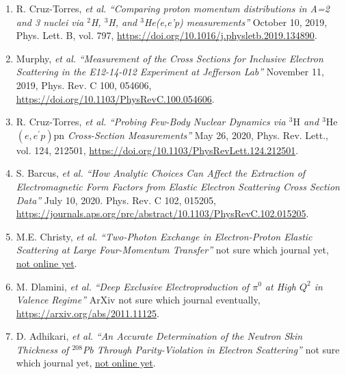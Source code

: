 \documentclass[letterpaper,10pt]{article}
\begin{document}
{\begin{enumerate}

\item R. Cruz-Torres, \textit{et al.} \textit{``Comparing proton momentum distributions in A=2 and 3 nuclei via $^2$H, $^3$H, and $^3$He(e,e'p) measurements''} October 10, 2019, Phys. Lett. B, vol. 797, \url{https://doi.org/10.1016/j.physletb.2019.134890}.

\item Murphy, \textit{et al.} \textit{``Measurement of the Cross Sections for Inclusive Electron Scattering in the E12-14-012 Experiment at Jefferson Lab''} November 11, 2019, Phys. Rev. C 100, 054606, \url{https://doi.org/10.1103/PhysRevC.100.054606}.

\item R. Cruz-Torres, \textit{et al.} \textit{``Probing Few-Body Nuclear Dynamics via $^{3}\mathrm{H}$ and $^{3}\mathrm{He}$ $(e,{e}^{\ensuremath{'}}p)\mathrm{pn}$ Cross-Section Measurements''} May 26, 2020, Phys. Rev. Lett., vol. 124, 212501, \url{https://doi.org/10.1103/PhysRevLett.124.212501}.

\item S. Barcus, \textit{et al.} \textit{``How Analytic Choices Can Affect the Extraction of Electromagnetic Form Factors from Elastic Electron Scattering Cross Section Data''} July 10, 2020. Phys. Rev. C 102, 015205, \url{https://journals.aps.org/prc/abstract/10.1103/PhysRevC.102.015205}.

\item M.E. Christy, \textit{et al.} \textit{``Two-Photon Exchange in Electron-Proton Elastic Scattering at Large Four-Momentum Transfer''} not sure which journal yet, \url{not online yet}.%

\item M. Dlamini, \textit{et al.} \textit{``Deep Exclusive Electroproduction of $\pi^0$ at High $Q^2$ in Valence Regime''} ArXiv not sure which journal eventually, \url{https://arxiv.org/abs/2011.11125}.%

\item D. Adhikari, \textit{et al.} \textit{``An Accurate Determination of the Neutron Skin Thickness of $^208$Pb Through Parity-Violation in Electron Scattering''} not sure which journal yet, \url{not online yet}.%


\end{enumerate}}
\end{document}
